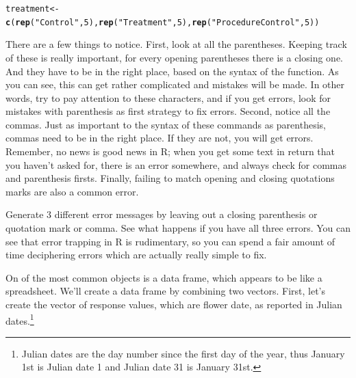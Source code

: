 \documentclass{tufte-handout}\usepackage[]{graphicx}\usepackage[]{xcolor}
\makeatletter
\newcommand{\hlnum}[1]{\textcolor[rgb]{0.686,0.059,0.569}{#1}}%
\newcommand{\hlstr}[1]{\textcolor[rgb]{0.192,0.494,0.8}{#1}}%
\newcommand{\hlstd}[1]{\textcolor[rgb]{0.345,0.345,0.345}{#1}}%
\newcommand{\hlkwb}[1]{\textcolor[rgb]{0.69,0.353,0.396}{#1}}%
\newcommand{\hlkwd}[1]{\textcolor[rgb]{0.737,0.353,0.396}{\textbf{#1}}}%
\newenvironment{kframe}{%
 \def\at@end@of@kframe{}%
 \ifinner\ifhmode%
  \def\at@end@of@kframe{\end{minipage}}%
  \begin{minipage}{\columnwidth}%
 \fi\fi%
 \def\FrameCommand##1{\hskip\@totalleftmargin \hskip-\fboxsep
 \colorbox{shadecolor}{##1}\hskip-\fboxsep
     \hskip-\linewidth \hskip-\@totalleftmargin \hskip\columnwidth}%
 \MakeFramed {\advance\hsize-\width
   \@totalleftmargin\z@ \linewidth\hsize
   \@setminipage}}%
 {\par\unskip\endMakeFramed%
 \at@end@of@kframe}
\newenvironment{knitrout}{}{} %
\makeatother
\begin{document}
\begin{knitrout}
\color{fgcolor}\begin{kframe}
\begin{alltt}
\hlstd{treatment} \hlkwb{<-} \hlkwd{c}\hlstd{(}\hlkwd{rep}\hlstd{(}\hlstr{"Control"}\hlstd{,} \hlnum{5}\hlstd{),} \hlkwd{rep}\hlstd{(}\hlstr{"Treatment"}\hlstd{,} \hlnum{5}\hlstd{),} \hlkwd{rep}\hlstd{(}\hlstr{"Procedure Control"}\hlstd{,} \hlnum{5}\hlstd{))}
\end{alltt}
\end{kframe}
\end{knitrout}

There are a few things to notice. First, look at all the parentheses. Keeping track of these is really important, for every opening parentheses there is a closing one. And they have to be in the right place, based on the syntax of the function. As you can see, this can get rather complicated and mistakes will be made. In other words, try to pay attention to these characters, and if you get errors, look for mistakes with parenthesis as first strategy to fix errors. Second, notice all the commas. Just as important to the syntax of these commands as parenthesis, commas need to be in the right place. If they are not, you will get errors. Remember, no news is good news in R; when you get some text in return that you haven't asked for, there is an error somewhere, and always check for commas and parenthesis firsts. Finally, failing to match opening and closing quotations marks are also a common error. 

Generate 3 different error messages by leaving out a closing parenthesis or quotation mark or comma. See what happens if you have all three errors. You can see that error trapping in R is rudimentary, so you can spend a fair amount of time deciphering errors which are actually really simple to fix. 

On of the most common objects is a data frame, which appears to be like a spreadsheet. We'll create a data frame by combining two vectors. First, let's create the vector of response values, which are flower date, as reported in Julian dates.\footnote[][-1.1cm]{Julian dates are the day number since the first day of the year, thus January 1st is Julian date 1 and Julian date 31 is January 31st.}
\end{document}
